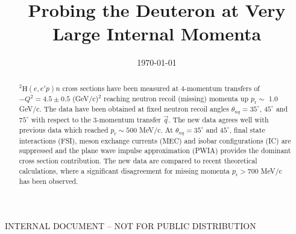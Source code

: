 \documentclass[aps,prl,twocolumn,showpacs,superscriptaddress,groupedaddress]{revtex4-2}  %
\begin{document}
\widetext
{}
\centerline{INTERNAL DOCUMENT -- NOT FOR PUBLIC DISTRIBUTION}


\title{Probing the Deuteron at Very Large Internal Momenta}



\date{\today}


\begin{abstract}
$^{2}\mathrm{H}(e,e'p)n$ cross sections have been measured at 4-momentum transfers of $-Q^{2} = 4.5 \pm 0.5$ (GeV/c)$^{2}$
reaching neutron recoil (missing) momenta up $p_{\mathrm{r}}\sim$ 1.0 GeV/c. The data have been obtained at fixed neutron recoil angles
$\theta_{nq} = 35^\circ$, $45^\circ$ and $75^{\circ}$  with respect to the 3-momentum
transfer $\vec q$. The new data agrees well with previous data which reached $p_{\mathrm{r}}\sim500$ MeV/c. At $\theta_{nq} = 35^\circ$ and $45^\circ$, final state interactions (FSI),
meson exchange currents (MEC) and isobar configurations (IC) are
suppressed and the plane wave impulse approximation (PWIA) provides the
dominant cross section contribution. The new data are compared to recent
theoretical calculations, where a significant disagreement for
missing momenta $p_{\mathrm{r}}>700$ MeV/c has been observed. 
\end{abstract}

\pacs{}
\maketitle

\end{document}
